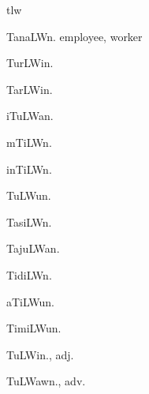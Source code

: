 \begin{multicols*}{2}
\begin{dictroot}{t}{lw}
\begin{dictentry}{TanaLW}{n.}
{            employee, worker
        }
    \end{dictentry}
    \begin{dictentry}{TurLWi}{n.}
    \end{dictentry}
    \begin{dictentry}{TarLWi}{n.}
    \end{dictentry}
    \begin{dictentry}{iTuLWa}{n.}
    \end{dictentry}
    \begin{dictentry}{mTiLW}{n.}
    \end{dictentry}
    \begin{dictentry}{inTiLW}{n.}
    \end{dictentry}
    \begin{dictentry}{TuLWu}{n.}
    \end{dictentry}
    \begin{dictentry}{TasiLW}{n.}
    \end{dictentry}
    \begin{dictentry}{TajuLWa}{n.}
    \end{dictentry}
    \begin{dictentry}{TidiLW}{n.}
    \end{dictentry}
    \begin{dictentry}{aTiLWu}{n.}
    \end{dictentry}
    \begin{dictentry}{TimiLWu}{n.}
    \end{dictentry}
    \begin{dictentry}{TuLWi}{n., adj.}
    \end{dictentry}
    \begin{dictentry}{TuLWaw}{n., adv.}
    \end{dictentry}
\end{dictroot}


\end{multicols*}
